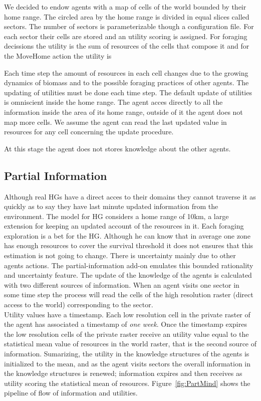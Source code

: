 \documentclass[11pt,oneside,a4paper,openright]{report}
\begin{document}
We decided to endow agents with a map of cells of the world bounded by their home range. The circled area by the home range is divided in equal slices called sectors. The number of sectors is parameterizable though a configuration file.   
For each sector their cells are stored and an utility scoring is assigned. For foraging decissions the utility is the sum of resources of the cells that compose it and for the MoveHome action the utility is %

Each time step the amount of resources in each cell changes due to the growing dynamics of biomass and to the possible foraging practices of other agents. The updating of utilities must be done each time step. The default update of utilities is omniscient inside the home range. The agent acces directly to all the information inside the area of its home range, outside of it the agent does not map more cells. We assume the agent can read the last updated value in resources for any cell concerning the update procedure. 

At this stage the agent does not stores knowledge about the other agents.

\subsection{Partial Information}
\label{sec:PartialInformation}

Although real HGs have a direct acces to their domains they cannot traverse it as quickly as to say they have last minute updated information from the environment. The model for HG considers a home range of 10km, a large extension for keeping an updated account of the resources in it. Each foraging exploration is a bet for the HG. Although he can know that in average one zone has enough resources to cover the survival threshold it does not ensures that this estimation is not going to change. There is uncertainty mainly due to other agents actions. The partial-information add-on emulates this bounded rationality and uncertainty feature. The update of the knowledge of the agents is calculated with two different sources of information. When an agent visits one sector in some time step the process will read the cells of the high resolution raster (direct access to the world) corresponding to the sector.\\
Utility values have a timestamp. Each low resolution cell in the private raster of the agent has associated a timestamp of \emph{one week}. Once the timestamp expires the low resolution cells of the private raster receive an utility value equal to the statistical mean value of resources in the world raster, that is the second source of information. 
Sumarizing, the utility in the knowledge structures of the agents is initialized to the mean, and as the agent visits sectors the overall information in the knowledge structures is renewed; information expires and then receives as utility scoring the statistical mean of resources. 
Figure~\ref{fig:PartMind} shows the pipeline of flow of information and utilities.
\end{document}
